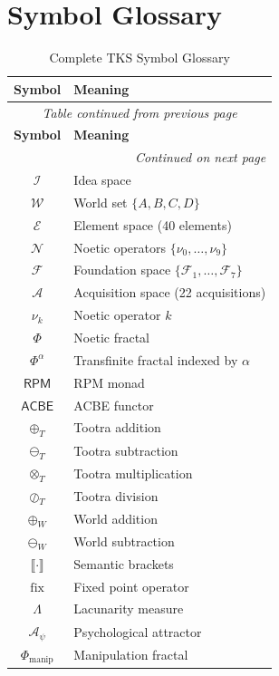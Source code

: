 \documentclass[11pt,twoside]{book}
\newcommand{\noe}[1]{\nu_{#1}}
\newcommand{\Ideas}{\mathcal{I}}
\newcommand{\Worlds}{\mathcal{W}}
\newcommand{\Elements}{\mathcal{E}}
\newcommand{\Noetics}{\mathcal{N}}
\newcommand{\Foundations}{\mathcal{F}}
\newcommand{\Acquisitions}{\mathcal{A}}
\newcommand{\Frac}{\Phi}
\newcommand{\TransFrac}[1]{\Phi^{#1}}
\newcommand{\RPM}{\mathsf{RPM}}
\newcommand{\ACBE}{\mathsf{ACBE}}
\newcommand{\fix}{\mathrm{fix}}
\newcommand{\sem}[1]{\llbracket #1 \rrbracket}
\newcommand{\Tadd}{\oplus_T}
\newcommand{\Tsub}{\ominus_T}
\newcommand{\Tmul}{\otimes_T}
\newcommand{\Tdiv}{\oslash_T}
\newcommand{\Wadd}{\oplus_W}
\newcommand{\Wsub}{\ominus_W}
\newcommand{\Lacunarity}{\Lambda}
\newcommand{\PsychAttractor}{\mathcal{A}_\psi}
\newcommand{\ManipFrac}{\Phi_{\mathrm{manip}}}
\begin{document}
\chapter{Symbol Glossary}
\label{app:glossary}

\begin{center}
\small
\begin{longtable}{c|l}
\caption{Complete TKS Symbol Glossary} \\
\toprule
\textbf{Symbol} & \textbf{Meaning} \\
\midrule
\endfirsthead
\multicolumn{2}{c}{\textit{Table continued from previous page}} \\
\toprule
\textbf{Symbol} & \textbf{Meaning} \\
\midrule
\endhead
\midrule
\multicolumn{2}{r}{\textit{Continued on next page}} \\
\endfoot
\bottomrule
\endlastfoot
$\Ideas$ & Idea space \\
$\Worlds$ & World set $\{A, B, C, D\}$ \\
$\Elements$ & Element space (40 elements) \\
$\Noetics$ & Noetic operators $\{\noe{0}, \ldots, \noe{9}\}$ \\
$\Foundations$ & Foundation space $\{\Foundations_1, \ldots, \Foundations_7\}$ \\
$\Acquisitions$ & Acquisition space (22 acquisitions) \\
$\noe{k}$ & Noetic operator $k$ \\
$\Frac$ & Noetic fractal \\
$\TransFrac{\alpha}$ & Transfinite fractal indexed by $\alpha$ \\
$\RPM$ & RPM monad \\
$\ACBE$ & ACBE functor \\
$\Tadd$ & Tootra addition \\
$\Tsub$ & Tootra subtraction \\
$\Tmul$ & Tootra multiplication \\
$\Tdiv$ & Tootra division \\
$\Wadd$ & World addition \\
$\Wsub$ & World subtraction \\
$\sem{\cdot}$ & Semantic brackets \\
$\fix$ & Fixed point operator \\
$\Lacunarity$ & Lacunarity measure \\
$\PsychAttractor$ & Psychological attractor \\
$\ManipFrac$ & Manipulation fractal \\

\end{longtable}
\end{center}
\end{document}
